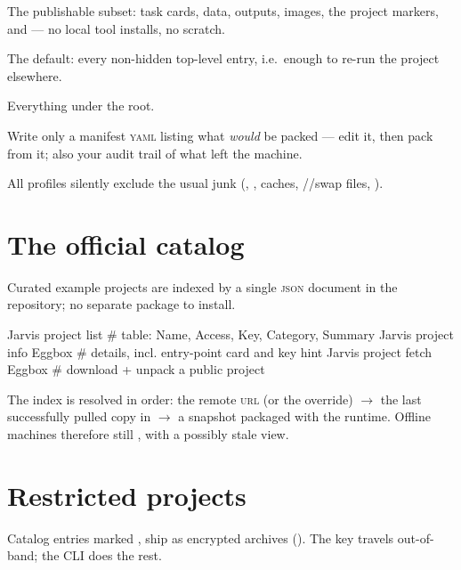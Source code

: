 \begin{keylist}
  \item[--share] The publishable subset: task cards, data, outputs, images, the
        project markers, and  --- no local tool installs, no scratch.
  \item[--repro] The default: every non-hidden top-level entry, i.e.\ enough to re-run
        the project elsewhere.
  \item[--full] Everything under the root.
  \item[--man] Write only a manifest \textsc{yaml} listing what \emph{would} be packed
        --- edit it, then pack from it; also your audit trail of what left the machine.
\end{keylist}

All profiles silently exclude the usual junk (, ,
caches, //swap files, ).

\section{The official catalog}
\label{sec:catalog}

Curated example projects are indexed by a single \textsc{json} document in the
 repository; no separate package to install.

\begin{terminal}
\begin{jcmd}
Jarvis project list          # table: Name, Access, Key, Category, Summary
Jarvis project info Eggbox   # details, incl. entry-point card and key hint
Jarvis project fetch Eggbox  # download + unpack a public project
\end{jcmd}
\end{terminal}

The index is resolved in order: the remote \textsc{url} (or the
 override) $\rightarrow$ the last
successfully pulled copy in  $\rightarrow$ a
snapshot packaged with the runtime. Offline machines therefore still , with a
possibly stale view.

\section{Restricted projects}
\label{sec:restricted}

Catalog entries marked ,  ship as
encrypted archives (). The key travels out-of-band; the CLI does
the rest.

